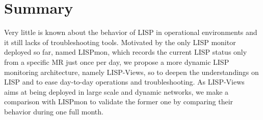 \section{Summary}
\label{sec:lispviews_conclusion}

Very little is known about the behavior of LISP in operational environments and it still lacks of troubleshooting tools. Motivated by the only LISP monitor deployed so far, named LISPmon, which records the current LISP status only from a specific MR just once per day, we propose a more dynamic LISP monitoring architecture, namely LISP-Views, so to deepen the understandings on LISP and to ease day-to-day operations and troubleshooting. As LISP-Views aims at being deployed in large scale and dynamic networks, we make a comparison with LISPmon to validate the former one by comparing their behavior during one full month.

